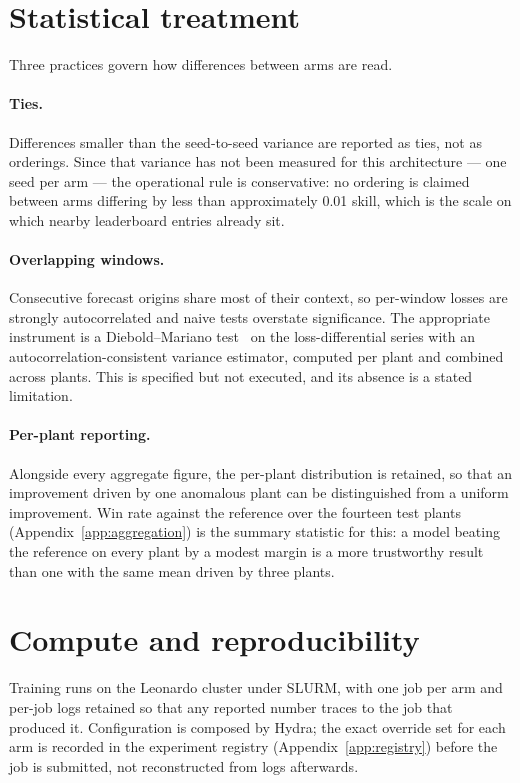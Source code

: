 \section{Statistical treatment}
\label{sec:statistics}

Three practices govern how differences between arms are read.

\paragraph{Ties.} Differences smaller than the seed-to-seed variance are reported as ties, not
as orderings. Since that variance has not been measured for this architecture --- one seed per
arm --- the operational rule is conservative: no ordering is claimed between arms differing by
less than approximately 0.01 skill, which is the scale on which nearby leaderboard entries
already sit.

\paragraph{Overlapping windows.} Consecutive forecast origins share most of their context, so
per-window losses are strongly autocorrelated and naive tests overstate significance. The
appropriate instrument is a Diebold--Mariano test~\cite{diebold} on the loss-differential
series with an autocorrelation-consistent variance estimator, computed per plant and combined
across plants. This is specified but not executed, and its absence is a stated limitation.

\paragraph{Per-plant reporting.} Alongside every aggregate figure, the per-plant distribution
is retained, so that an improvement driven by one anomalous plant can be distinguished from a
uniform improvement. Win rate against the reference over the fourteen test plants
(Appendix~\ref{app:aggregation}) is the summary statistic for this: a model beating the
reference on every plant by a modest margin is a more trustworthy result than one with the
same mean driven by three plants.

\section{Compute and reproducibility}
\label{sec:compute}

Training runs on the Leonardo cluster under SLURM, with one job per arm and per-job logs
retained so that any reported number traces to the job that produced it. Configuration is
composed by Hydra; the exact override set for each arm is recorded in the experiment registry
(Appendix~\ref{app:registry}) before the job is submitted, not reconstructed from logs
afterwards.

